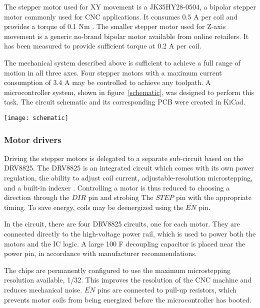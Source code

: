 The stepper motor used for XY movement is a JK35HY28-0504, a bipolar stepper
motor commonly used for CNC applications. It consumes 0.5 A per coil and
provides a torque of 0.1 Nm \cite{jk35hy28}. The smaller stepper motor used for
Z-axis movement is a generic no-brand bipolar motor available from online
retailers. It has been measured to provide sufficient torque at 0.2 A per coil.

The mechanical system described above is sufficient to achieve a full range of
motion in all three axes. Four stepper motors with a maximum current consumption
of 3.4 A may be controlled to achieve any toolpath. A microcontroller system,
shown in figure~\ref{schematic}, was designed to perform this task. The
circuit schematic and its corresponding PCB were created in KiCad.

\clearpage
\begin{sidewaysfigure}[ht]
    \texttt{[image: schematic]}
    \caption{A schematic of the microcontroller system.}
    \label{schematic}
\end{sidewaysfigure}

\clearpage

\subsubsection{Motor drivers}

Driving the stepper motors is delegated to a separate sub-circuit based on the
DRV8825. The DRV8825 is an integrated circuit which comes with its own power
regulation, the ability to adjust coil current, adjustable-resolution
microstepping, and a built-in indexer \cite{drv8825}. Controlling a motor is
thus reduced to choosing a direction through the $DIR$ pin and strobing The
$STEP$ pin with the appropriate timing. To save energy, coils may be deenergized
using the $\overline{EN}$ pin.

In the circuit, there are four DRV8825 circuits, one for each motor. They are
connected directly to the high-voltage power rail, which is used to power both
the motors and the IC logic. A large 100 {\textmu}F decoupling capacitor is
placed near the power pin, in accordance with manufacturer recommendations.

The chips are permanently configured to use the maximum microstepping resolution
available, 1/32. This improves the resolution of the CNC machine and
reduces mechanical noise. $\overline{EN}$ pins are connected to pull-up
resistors, which prevents motor coils from being energized before the
microcontroller has booted.

